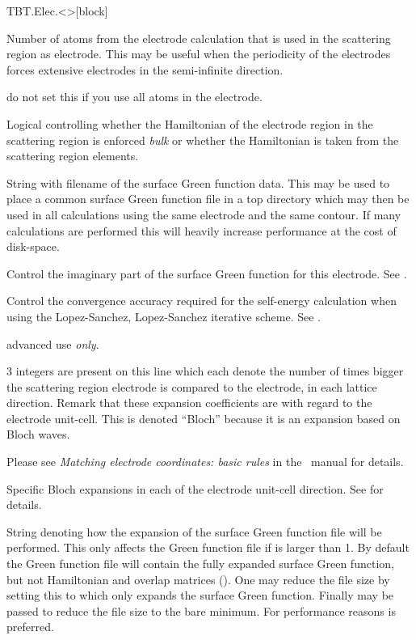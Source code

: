 \begin{fdfentry}{TBT.Elec.<>}[block]
\begin{fdfoptions}
    Number of atoms from the electrode calculation that is used in the
    scattering region as electrode. This may be useful when the
    periodicity of the electrodes forces extensive electrodes in the
    semi-infinite direction.

    \note do not set this if you use all atoms in the electrode.

    \option[Bulk]%
    Logical controlling whether the Hamiltonian of the electrode
    region in the scattering region is enforced \emph{bulk} or whether
    the Hamiltonian is taken from the scattering region elements.

    \option[tbt.Gf/Gf]%
    String with filename of the surface Green function data. This may
    be used to place a common surface Green function file in a top
    directory which may then be used in all calculations using the
    same electrode and the same contour. 
    If many calculations are performed this will heavily increase
    performance at the cost of disk-space.

    
    \option[Eta]%
    Control the imaginary part of the surface Green function for this
    electrode. See .

    \option[Accuracy]%
    Control the convergence accuracy required for the self-energy
    calculation when using the Lopez-Sanchez, Lopez-Sanchez iterative
    scheme.
    See .

    \note advanced use \emph{only}.

    \option[Bloch]%
    $3$ integers are present on this line which each denote the number
    of times bigger the scattering region electrode is compared to the
    electrode, in each lattice direction. Remark that these expansion
    coefficients are with regard to the electrode unit-cell.
    This is denoted ``Bloch'' because it is an expansion based on
    Bloch waves.

    Please see \emph{Matching electrode coordinates: basic rules} in
    the \siesta\ manual for details.

    \option[Bloch-A/a1|B/a2|C/a3]%
    Specific Bloch expansions in each of the electrode unit-cell
    direction. See  for details.

    String denoting how the expansion of the surface Green function
    file will be performed. This only affects the Green function file
    if  is larger than 1. By default the Green function
    file will contain the fully expanded surface Green function, but
    not Hamiltonian and overlap matrices (). One may
    reduce the file size by setting this to  which only
    expands the surface Green function. Finally  may be
    passed to reduce the file size to the bare minimum.
    For performance reasons  is preferred. 


\end{fdfoptions}
\end{fdfentry}
